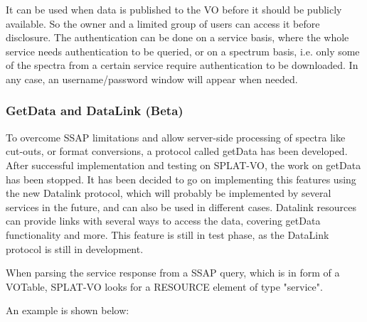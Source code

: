 \documentclass[final,authoryear,5p,times,twocolumn]{elsarticle}
\begin{document}
It can be used when data is published to the VO before it should be
publicly available. So the owner and a limited group of users can
access it before disclosure. The authentication can be done on a
service basis, where the whole service needs authentication to be
queried, or on a spectrum basis, i.e. only some of the spectra from a
certain service require authentication to be downloaded. In any case,
an username/password window will appear when needed.

\subsubsection{GetData and DataLink (Beta)}

To overcome SSAP limitations and allow server-side processing of
spectra like cut-outs, or format conversions, a protocol called
getData has been developed. After successful implementation and
testing on SPLAT-VO, the work on getData has been stopped. It has been
decided to go on implementing this features using the new Datalink
protocol, which will probably be implemented by several services in
the future, and can also be used in different cases.  Datalink
resources can provide links with several ways to access the data,
covering getData functionality and more. This feature is still in test
phase, as the DataLink protocol is still in development.

When parsing the service response from a SSAP query, which is in form
of a VOTable, SPLAT-VO looks for a RESOURCE element of type "service".

An example is shown below:
\end{document}
